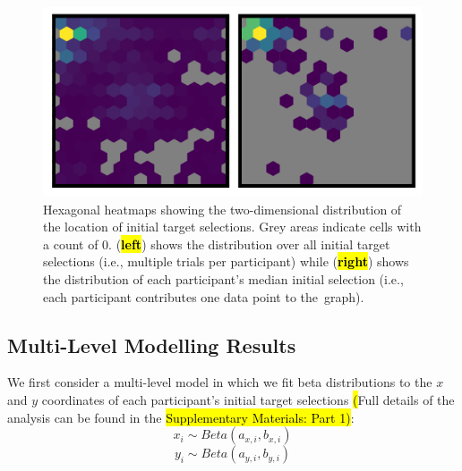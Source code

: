 \documentclass[vision,article,accept,pdftex,moreauthors]{Definitions/mdpi}
\begin{document}
\begin{figure}[H]
\includegraphics[width=12 cm]{Figures/init_sel_hex_plot.pdf}
\caption{Hexagonal heatmaps showing the two-dimensional distribution of the location of initial target selections. Grey areas indicate cells with a count of 0. ({\textbf{\hl{left}}}) shows the distribution over all initial target selections (i.e., multiple trials per participant) while ({\textbf{\hl{right}}}) shows the distribution of each participant's median initial selection (i.e., each participant contributes one data point to the~graph). }%

\label{fig:qjep_init_sel_hex}
\end{figure} 

\subsection{Multi-Level Modelling Results}

We first consider a multi-level model in which we fit beta distributions to the $x$ and $y$ coordinates of each participant's initial target selections \hl{(}Full details of the analysis can be found in the \hl{Supplementary Materials: Part 1}\hl{)}:%
\begin{equation}
    x_i \sim Beta(a_{x,i}, b_{x,i})
    \label{eq:beta1x}
\end{equation}
\begin{equation}
    y_i \sim Beta(a_{y,i}, b_{y,i})
    \label{eq:beta1y}
\end{equation}
\end{document}
